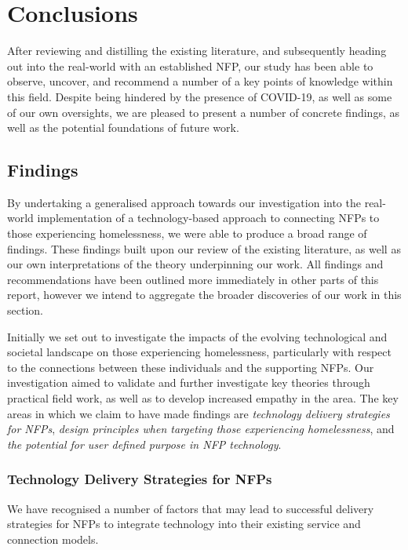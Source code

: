 \chapter{Conclusions}

After reviewing and distilling the existing literature, and subsequently heading out into the real-world with an established NFP, our study has been able to observe, uncover, and recommend a number of a key points of knowledge within this field. Despite being hindered by the presence of COVID-19, as well as some of our own oversights, we are pleased to present a number of concrete findings, as well as the potential foundations of future work.

\section{Findings}

By undertaking a generalised approach towards our investigation into the real-world implementation of a technology-based approach to connecting NFPs to those experiencing homelessness, we were able to produce a broad range of findings. These findings built upon our review of the existing literature, as well as our own interpretations of the theory underpinning our work. All findings and recommendations have been outlined more immediately in other parts of this report, however we intend to aggregate the broader discoveries of our work in this section.

Initially we set out to investigate the impacts of the evolving technological and societal landscape on those experiencing homelessness, particularly with respect to the connections between these individuals and the supporting NFPs. Our investigation aimed to validate and further investigate key theories through practical field work, as well as to develop increased empathy in the area. The key areas in which we claim to have made findings are \emph{technology delivery strategies for NFPs}, \emph{design principles when targeting those experiencing homelessness}, and \emph{the potential for user defined purpose in NFP technology}.

\subsection{Technology Delivery Strategies for NFPs}

We have recognised a number of factors that may lead to successful delivery strategies for NFPs to integrate technology into their existing service and connection models. 

